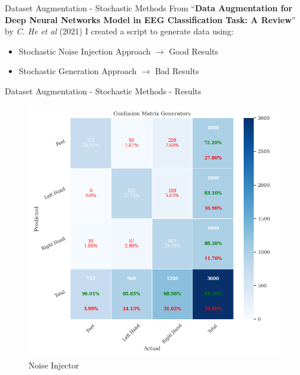 \begin{frame}{Dataset Augmentation - Stochastic Methods}
    From ``\textbf{Data Augmentation for Deep Neural Networks Model in EEG Classification Task: A Review}'' by \textit{C. He et al} (2021) I created a script to generate data using:
    \begin{itemize}
        \item Stochastic Noise Injection Approach $\rightarrow{}$ Good Results
        \item Stochastic Generation Approach $\rightarrow{}$ Bad Results
    \end{itemize}
\end{frame}
\begin{frame}{Dataset Augmentation - Stochastic Methods - Results}
    \begin{minipage}{0.49\textwidth}
        \begin{figure}[htpb!]
            \centering
            \includegraphics[width=\textwidth]{figures/augmentation/stochastic/confusion_matrix_generators_2024_03_30_18_00_20_noise_injector_using_LSTMNet_0.5943600867678959.pkl.png}
            \caption{Noise Injector}
        \end{figure}
    \end{minipage}
    \begin{minipage}{0.49\textwidth}
        \begin{figure}[htpb!]

\end{figure}
\end{minipage}
\end{frame}
